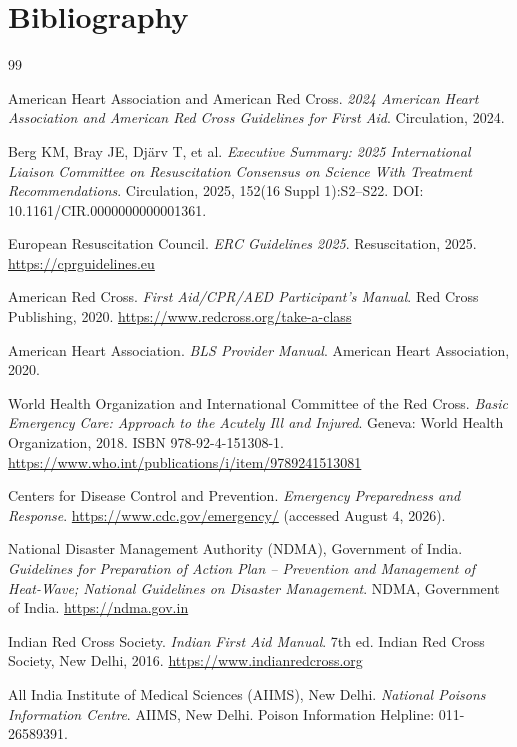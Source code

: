 \chapter*{Bibliography}

\begin{thebibliography}{99}

American Heart Association and American Red Cross.
\textit{2024 American Heart Association and American Red Cross Guidelines for First Aid}.
Circulation, 2024.

Berg KM, Bray JE, Dj\"arv T, et al.
\textit{Executive Summary: 2025 International Liaison Committee on Resuscitation Consensus on Science With Treatment Recommendations}.
Circulation, 2025, 152(16 Suppl 1):S2--S22. DOI: 10.1161/CIR.0000000000001361.

European Resuscitation Council.
\textit{ERC Guidelines 2025}.
Resuscitation, 2025. \url{https://cprguidelines.eu}

American Red Cross.
\textit{First Aid/CPR/AED Participant's Manual}.
Red Cross Publishing, 2020. \url{https://www.redcross.org/take-a-class}

American Heart Association.
\textit{BLS Provider Manual}.
American Heart Association, 2020.

World Health Organization and International Committee of the Red Cross.
\textit{Basic Emergency Care: Approach to the Acutely Ill and Injured}.
Geneva: World Health Organization, 2018. ISBN 978-92-4-151308-1. \url{https://www.who.int/publications/i/item/9789241513081}

Centers for Disease Control and Prevention.
\textit{Emergency Preparedness and Response}.
\url{https://www.cdc.gov/emergency/} (accessed August 4, 2026).

National Disaster Management Authority (NDMA), Government of India.
\textit{Guidelines for Preparation of Action Plan -- Prevention and Management of Heat-Wave; National Guidelines on Disaster Management}.
NDMA, Government of India. \url{https://ndma.gov.in}

Indian Red Cross Society.
\textit{Indian First Aid Manual}. 7th ed.
Indian Red Cross Society, New Delhi, 2016. \url{https://www.indianredcross.org}

All India Institute of Medical Sciences (AIIMS), New Delhi.
\textit{National Poisons Information Centre}.
AIIMS, New Delhi. Poison Information Helpline: 011-26589391.


\end{thebibliography}
